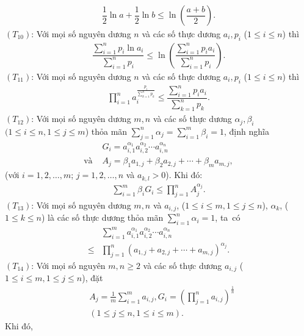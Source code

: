\begin{multicols}{2}
{\begin{align*}
			\dfrac{1}{2}\ln a+\dfrac{1}{2}\ln b \le \ln \left(\dfrac{a+b}{2} \right).
		\end{align*}
		$(T_{10})$: Với mọi số nguyên dương $n$ và các số thực dương $a_i,p_i$ ($1\le i \le n$) thì
		\begin{align*}
			\dfrac{\sum_{i=1}^n p_i\ln a_i}{\sum_{i=1}^n p_i} \le \ln \left(\dfrac{ \sum_{i=1}^n p_ia_i}{\sum_{i=1}^n p_i} \right).
		\end{align*}
		$(T_{11})$: Với mọi số nguyên dương $n$ và các số thực dương $a_i,p_i$ ($1\le i \le n$) thì
		\begin{align*}
			\prod_{i=1}^{n} a_{i}^{\frac{p_{i}}{\sum_{k=1}^{n} p_{k}}} \leq \dfrac{\sum_{i=1}^{n} p_{i} a_{i}}{\sum_{k=1}^{n} p_{k}}.
		\end{align*}
		$(T_{12})$:  Với mọi số nguyên dương $m, n$ và các số thực
		dương $\alpha_{j}, \beta_{i}$ $(1\le i \le n, 1\le j \le m$) thỏa mãn $\sum_{j=1}^{n} \alpha_{j}=\sum_{i=1}^{m} \beta_{i}=1$, định nghĩa
		\begin{align*}
			&G_{i}=a_{i,1}^{\alpha_{1}} a_{i, 2}^{\alpha_{2}} \cdots a_{i,n}^{\alpha_{n}} \\
			\text{và } &A_{j}=\beta_{1} a_{1,j}+\beta_{2} a_{2,j}+\cdots+\beta_{m} a_{m,j},
		\end{align*}
		(với $i=1,2, \ldots, m$; $j=1,2, \ldots, n$ và \linebreak$a_{k,l}>0$).
		Khi đó:
		\begin{align*}
			\sum_{i=1}^{m} \beta_{i} G_{i} \leq \prod_{j=1}^{n} A_{j}^{\alpha_{j}}.
		\end{align*}
		$(T_{13})$: Với mọi số nguyên dương $m, n$ và $a_{i,j}$, ($1\le i\le m, 1\le j \le n$), $\alpha_k$, ($1\le k \le n$) là các số thực dương thỏa mãn $\sum_{i=1}^n \alpha_i=1$, ta~có
		\begin{align*}
			&\sum_{i=1}^{m} a_{i, 1}^{\alpha_{1}} a_{i, 2}^{\alpha_{2}} \cdots a_{i, n}^{\alpha_{n}} \\
			\leq &\prod_{j=1}^{n}\left(a_{1, j}+a_{2,j}+\cdots+a_{m, j}\right)^{\alpha_{j}}.
		\end{align*}
		$(T_{14})$: Với mọi số nguyên $m,n \geq 2$ và các số thực dương $a_{i, j}$ ($1\le i \le m, 1\le j \le n$), đặt
		\begin{align*}
			&A_{j}=\frac{1}{m} \sum_{i=1}^{m} a_{i,j}, G_{i}=\left(\prod_{j=1}^{n} a_{i,j}\right)^{\frac{1}{n}} \\
			&(1\le j \le n, 1\le i \le m).
		\end{align*} 
		Khi đó,
		\begin{align*}

\end{align*}}
\end{multicols}
